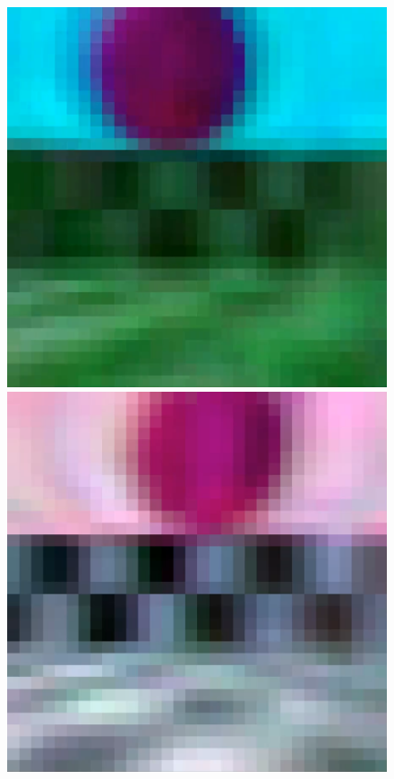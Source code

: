 \begin{figure}[p]
  \centering
  \includegraphics[width=\imgWithTripple]{images/workflow/FunctionalF1.png} \\[\picVdist]
  \includegraphics[width=\imgWithTripple]{images/workflow/FunctionalF2.png} \\[\picVdist]

\end{figure}
